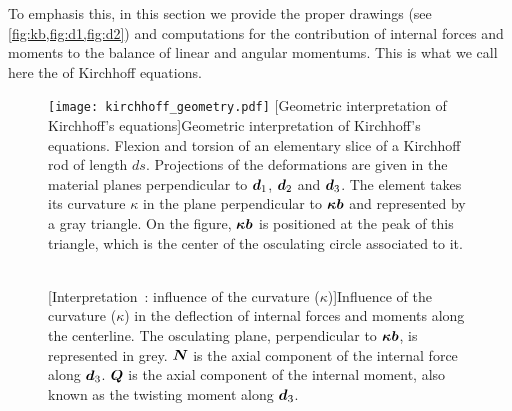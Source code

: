 To emphasis this, in this section we provide the proper drawings (see \cref{fig:kb,fig:d1,fig:d2}) and computations for the contribution of internal forces and moments to the balance of linear and angular momentums. This is what we call here the  of Kirchhoff equations.
\begin{figure}[p]
  \begin{fullpage}
	\centering
	\texttt{[image: kirchhoff\_geometry.pdf]}
	[Geometric interpretation of Kirchhoff's equations]{Geometric interpretation of Kirchhoff's equations. Flexion and torsion of an elementary slice of a Kirchhoff rod of length $ds$. Projections of the deformations are given in the material planes perpendicular to $\boldsymbol{d}_1$, $\boldsymbol{d}_2$ and $\boldsymbol{d}_3$. The element takes its curvature $\kappa$ in the plane perpendicular to $\boldsymbol{\kappa b}$ and represented by a gray triangle. On the figure, $\boldsymbol{\kappa b}$ is positioned at the peak of this triangle, which is the center of the osculating circle associated to it.}
	\label{fig:slice}
 \end{fullpage}
\end{figure} 
\begin{figure}[p]
  \begin{leftfullpage}
    \captionsetup[subfloat]{captionskip=10pt}
     	\centering
     	 \\
	\vspace{30pt}
	\vspace{30pt}
	[Interpretation~: influence of the curvature ($\kappa$)]{Influence of the curvature ($\kappa$) in the deflection of internal forces and moments along the centerline. The osculating plane, perpendicular to $\boldsymbol{\kappa b}$, is represented in grey. $\boldsymbol{N}$ is the axial component of the internal force along $\boldsymbol{d}_3$. $\boldsymbol{Q}$ is the axial component of the internal moment, also known as the twisting moment along $\boldsymbol{d}_3$.}     
	\label{fig:kb}
 \end{leftfullpage}
\end{figure}
